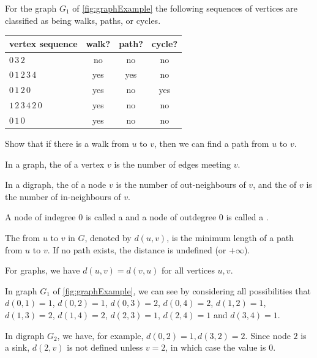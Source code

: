 \begin{Example}
For the graph $G_1$ of \cref{fig:graphExample} the following
sequences of vertices are classified as being walks, paths, or cycles.

\medskip

\begin{center}
\begin{tabular}{|l|c|c|c|}\hline
\textbf{vertex sequence} & \textbf{walk?} & \textbf{path?} & \textbf{cycle?} \\ \hline
$0\, 3\, 2$ & no & no & no  \\
$0\, 1\, 2\, 3\, 4$ & yes & yes & no  \\
$0\, 1\,  2\,  0$ & yes & no & yes  \\
$1\,  2\,  3\,  4\,  2\,  0$ & yes & no & no \\
$0 \, 1\,  0$ & yes & no & no \\
\hline
\end{tabular}
\end{center}
\end{Example}

\begin{Boxample}[8]
Show that if there is a walk from $u$ to $v$, then we can find a path from $u$ to $v$.
\end{Boxample}


\begin{Definition} 
In a graph, the  of a vertex $v$ is the number of edges meeting $v$. 

In a digraph, the  of a node $v$ is the number of out-neighbours of $v$, 
and the  of $v$ is the number of in-neighbours of $v$.

A node of indegree $0$ is called a  and a node of outdegree $0$ is called a .
\end{Definition}


\begin{Definition}
The  from $u$ to $v$ in $G$, denoted by $d(u,v)$, is 
the minimum length of a path from $u$ to $v$. If no path exists, the 
distance is undefined (or $+\infty$).
\end{Definition}

For graphs, we have $d(u,v) = d(v,u)$ for all vertices $u, v$. 

\begin{Example}
In graph $G_1$ of \cref{fig:graphExample}, we can see by considering
all possibilities that $d(0, 1) = 1$, $d(0, 2) = 1$, $d(0, 3) = 2$,
$d(0, 4) = 2$, $d(1, 2) = 1$, $d(1, 3) = 2$, $d(1, 4) = 2$, $d(2, 3) =
1$, $d(2, 4) = 1$ and $d(3, 4) = 1$.

In digraph $G_2$, we have, for example, $d(0, 2) = 1, 
d(3, 2) = 2$. Since node $2$ is a sink, $d(2, v)$ is not defined 
unless $v = 2$, in which case the value is $0$.

\end{Example}

